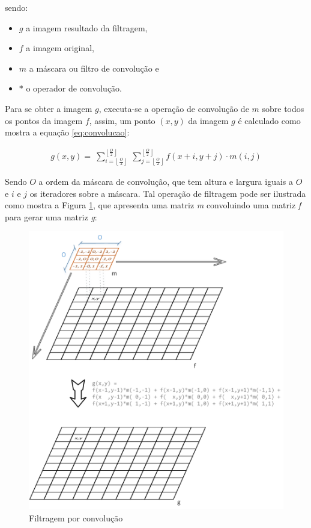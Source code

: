 sendo:

\begin{itemize}
\item \(g\) a imagem resultado da filtragem, 
\item \(f\) a imagem original, 
\item \(m\) a máscara ou filtro de convolução e 
\item \(*\) o operador de convolução.
\end{itemize}

Para se obter a imagem \(g\), executa-se a operação de convolução de \(m\) sobre todos os pontos da imagem \(f\), assim, um ponto \((x,y)\) da imagem \(g\) é calculado como mostra a equação \ref{eq:convolucao}:
	
\begin{equation}
\label{eq:convolucao}
\begin{split}
g(x,y) = \
\sum_{i=\left\lfloor\frac{O}{2}\right\rfloor}^{\left\lfloor\frac{O}{2}\right\rfloor} \
\sum_{j=\left\lfloor\frac{O}{2}\right\rfloor}^{\left\lfloor\frac{O}{2}\right\rfloor}  f(x+i, y+j) \cdot m(i,j)
\end{split}
\end{equation}

Sendo \(O\) a ordem da máscara de convolução, que tem altura e largura iguais a \(O\) e \(i\) e \(j\) os iteradores sobre a máscara. Tal operação de filtragem pode ser ilustrada como mostra a Figura \ref{fig:Convolution}, que apresenta uma matriz \emph{m} convoluindo uma matriz \emph{f} para gerar uma matriz \emph{g}:

\begin{figure}[h]
	\centering	
	\includegraphics[scale=0.55]{Figuras/Convolutio.png}
	\caption{Filtragem por convolução}
	\label{fig:Convolution}
\end{figure}

